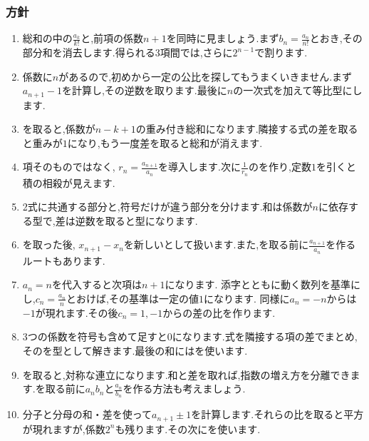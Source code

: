 \subsubsection{方針}\label{節：応用：方針}
\begin{enumerate}[label=\textbf{問\arabic*.},leftmargin=3.8em,format=\bookitemlink{practice-advanced}{hint}{answer}]
  \item 総和の中の$\frac{a_k}{k!}$と,前項の係数$n+1$を同時に見ましょう.まず$b_n=\frac{a_n}{n!}$とおき,その部分和を消去します.得られる3項間では,さらに$2^{n-1}$で割ります.
  \item 係数に$n$があるので,初めから一定の公比を探してもうまくいきません.まず$a_{n+1}-1$を計算し,その逆数を取ります.最後に$n$の一次式を加えて等比型にします.
  \item {}を取ると,係数が$n-k+1$の重み付き総和になります.隣接する式の差を取ると重みが$1$になり,もう一度差を取ると総和が消えます.
  \item 項そのものではなく, $r_n=\frac{a_{n+1}}{a_n}$を導入します.次に$\frac{1}{r_n}$のを作り,定数$1$を引くと積の相殺が見えます.
  \item 2式に共通する部分と,符号だけが違う部分を分けます.和は係数が$n$に依存する型で,差は逆数を取ると型になります.
  \item {}を取った後, $x_{n+1}-x_n$を新しいとして扱います.また,を取る前に$\frac{a_{n+1}}{a_n}$を作るルートもあります.
  \item $a_n=n$を代入すると次項は$n+1$になります.
    添字とともに動く数列を基準にし,$c_n=\frac{a_n}{n}$とおけば,その基準は一定の値$1$になります.
    同様に$a_n=-n$からは$-1$が現れます.その後$c_n=1,-1$からの差の比を作ります.
  \item 3つの係数を符号も含めて足すと$0$になります.式を隣接する項の差でまとめ,そのを型として解きます.最後の和にはを使います.
  \item {}を取ると,対称な連立になります.和と差を取れば,指数の増え方を分離できます.を取る前に$a_nb_n$と$\frac{a_n}{b_n}$を作る方法も考えましょう.
  \item 分子と分母の和・差を使って$a_{n+1}\pm1$を計算します.それらの比を取ると平方が現れますが,係数$2^n$も残ります.その次にを使います.
\end{enumerate}

